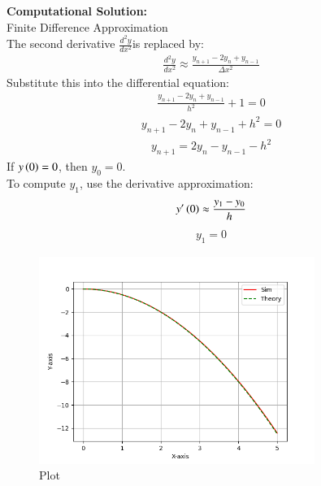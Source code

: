 \documentclass[journal]{IEEEtran}
\numberwithin{equation}{enumi}
\numberwithin{figure}{enumi}
\begin{document}
\textbf{Computational Solution:} \\
Finite Difference Approximation \\
The second derivative $\frac{d^2y}{dx^2}$is replaced by:\\
\begin{align}
	\frac{d^2y}{dx^2} \approx \frac{y_{n+1} - 2y_n + y_{n-1}}{\Delta x^2}
\end{align}
Substitute this into the differential equation:
\begin{align}
	\frac{y_{n+1} - 2y_n + y_{n-1}}{h^2} + 1 = 0
\end{align}
\begin{align}
	y_{n+1} - 2y_n + y_{n-1} + h^2 = 0
\end{align}
\begin{align}
	y_{n+1} = 2y_n - y_{n-1} - h^2
\end{align}
If $y\left(0\right) = 0$, then $y_0 = 0$. \\
To compute $y_1$, use the derivative approximation:
\begin{align}
	y^{\prime}\left(0\right) \approx \frac{y_1 - y_0}{h}
\end{align}
\begin{align}
	y_1 = 0
\end{align}



\begin{figure}[H]
    \centering
    \includegraphics[width=0.8\textwidth]{figs/fig.png}
    \caption{Plot}
\end{figure}
\end{document}
